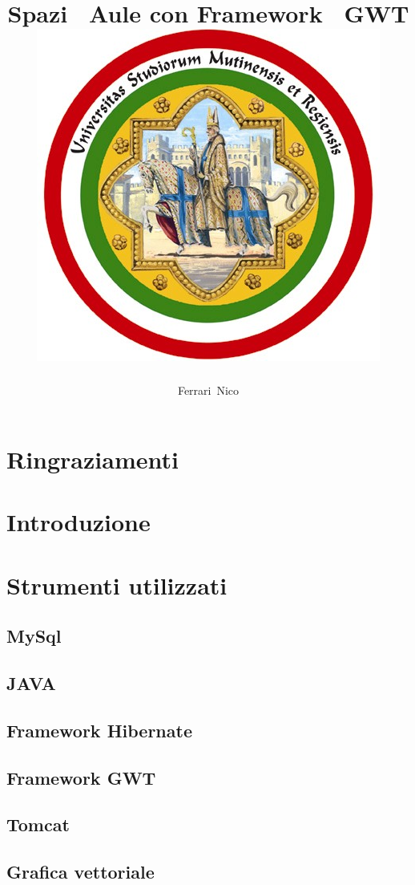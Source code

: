 \documentclass[a4paper,pt11,oneside]{book}
\title{
\huge
\textbf{Spazi ~Aule con Framework ~GWT}\\
{\includegraphics[scale=2]{university.jpg}}}
\author{Ferrari~Nico}
\begin{document}
\maketitle
\chapter*{Ringraziamenti}

\chapter*{Introduzione}

\tableofcontents
\listoffigures
\listoftables



\chapter{Strumenti utilizzati}

\section{MySql}


\section{JAVA}


\section{Framework Hibernate}


\section{Framework GWT}


\section{Tomcat}


\section{Grafica vettoriale}

\end{document}
